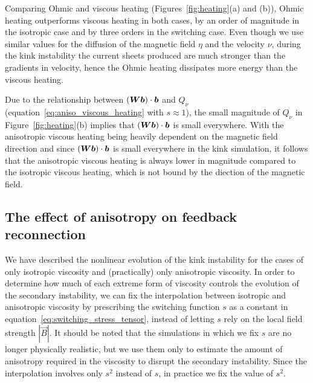 Comparing Ohmic and viscous heating (Figures~\ref{fig:heating}(a) and (b)), Ohmic heating outperforms viscous heating in both cases, by an order of magnitude in the isotropic case and by three orders in the switching case. Even though we use similar values for the diffusion of the magnetic field $\eta$ and the velocity $\nu$, during the kink instability the current sheets produced are much stronger than the gradients in velocity, hence the Ohmic heating dissipates more energy than the viscous heating.

Due to the relationship between $({\bm W} {\bm b}) \cdot {\bm b}$ and $Q_{\nu}$ (equation~\eqref{eq:aniso_viscous_heating} with $s\approx 1$), the small magnitude of $Q_{\nu}$ in Figure~\ref{fig:heating}(b) implies that $({\bm W} {\bm b}) \cdot {\bm b}$ is small everywhere. With the anisotropic viscous heating being heavily dependent on the magnetic field direction and since $({\bm W} {\bm b}) \cdot {\bm b}$ is small everywhere in the kink simulation, it follows that the anisotropic viscous heating is always lower in magnitude compared to the isotropic viscous heating, which is not bound by the diection of the magnetic field.

\subsection{The effect of anisotropy on feedback reconnection}

We have described the nonlinear evolution of the kink instability for the cases of only isotropic viscosity and (practically) only anisotropic viscosity. In order to determine how much of each extreme form of viscosity controls the evolution of the secondary instability, we can fix the interpolation between isotropic and anisotropic viscosity by prescribing the switching function $s$ as a constant in equation~\eqref{eq:switching_stress_tensor}, instead of letting $s$ rely on the local field strength $|\vec{B}|$. It should be noted that the simulations in which we fix $s$ are no longer physically realistic, but we use them only to estimate the amount of anisotropy required in the viscosity to disrupt the secondary instability. Since the interpolation involves only $s^2$ instead of $s$, in practice we fix the value of $s^2$.

